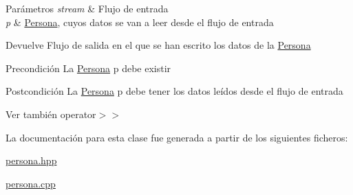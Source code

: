 \begin{DoxyParams}{Parámetros}
{\em stream} & Flujo de entrada \\
\hline
{\em p} & \hyperlink{classedi_1_1Persona}{Persona}, cuyos datos se van a leer desde el flujo de entrada \\
\hline
\end{DoxyParams}
\begin{DoxyReturn}{Devuelve}
Flujo de salida en el que se han escrito los datos de la \hyperlink{classedi_1_1Persona}{Persona} 
\end{DoxyReturn}
\begin{DoxyPrecond}{Precondición}
La \hyperlink{classedi_1_1Persona}{Persona} p debe existir 
\end{DoxyPrecond}
\begin{DoxyPostcond}{Postcondición}
La \hyperlink{classedi_1_1Persona}{Persona} p debe tener los datos leídos desde el flujo de entrada 
\end{DoxyPostcond}
\begin{DoxySeeAlso}{Ver también}
operator$>$$>$ 
\end{DoxySeeAlso}


La documentación para esta clase fue generada a partir de los siguientes ficheros\+:\begin{DoxyCompactItemize}
\item 
\hyperlink{persona_8hpp}{persona.\+hpp}\item 
\hyperlink{persona_8cpp}{persona.\+cpp}\end{DoxyCompactItemize}

